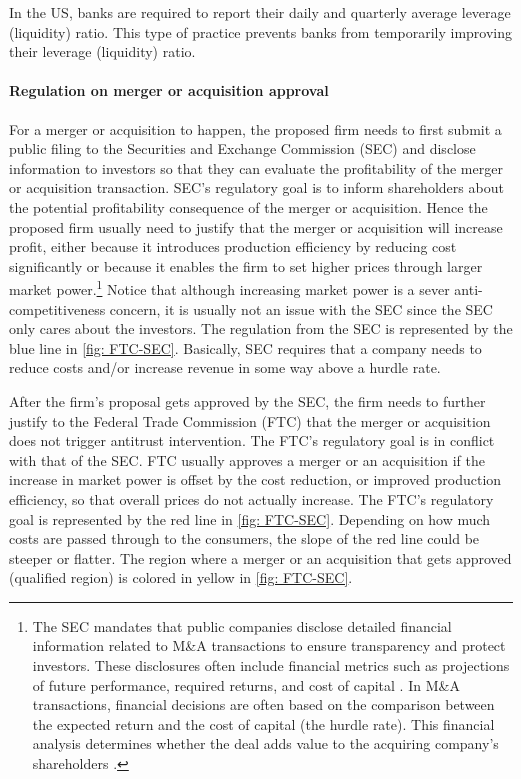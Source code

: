 In the US, banks are required to report their daily and quarterly average leverage (liquidity) ratio.
This type of practice prevents banks from temporarily improving their leverage (liquidity) ratio.




\paragraph{Regulation on merger or acquisition approval}
For a merger or acquisition to happen, the proposed firm needs to first submit a public filing to the Securities and Exchange Commission (SEC) and disclose information to investors so that they can evaluate the profitability of the merger or acquisition transaction.
SEC's regulatory goal is to inform shareholders about the potential profitability consequence of the merger or acquisition.
Hence the proposed firm usually need to justify that the merger or acquisition will increase profit, either because it introduces production efficiency by reducing cost significantly or because it enables the firm to set higher prices through larger market power.\footnote{The SEC mandates that public companies disclose detailed financial information related to M\&A transactions to ensure transparency and protect investors. These disclosures often include financial metrics such as projections of future performance, required returns, and cost of capital \citep{SEC_Regulation_SK, SEC_Form_S4}. In M\&A transactions, financial decisions are often based on the comparison between the expected return and the cost of capital (the hurdle rate). This financial analysis determines whether the deal adds value to the acquiring company’s shareholders \citep{jensen1983market}.}
Notice that although increasing market power is a sever anti-competitiveness concern, it is usually not an issue with the SEC since the SEC only cares about the investors.
The regulation from the SEC is represented by the blue line in \cref{fig: FTC-SEC}.
Basically, SEC requires that a company needs to reduce costs and/or increase revenue in some way above a hurdle rate.

After the firm's proposal gets approved by the SEC, the firm needs to further justify to the Federal Trade Commission (FTC) that the merger or acquisition does not trigger antitrust intervention. 
The FTC's regulatory goal is in conflict with that of the SEC. 
FTC usually approves a merger or an acquisition if the increase in market power is offset by the cost reduction, or improved production efficiency, so that overall prices do not actually increase. 
The FTC's regulatory goal is represented by the red line in \cref{fig: FTC-SEC}.
Depending on how much costs are  passed through to the consumers, the slope of the red line could be steeper or flatter.
The region where a merger or an acquisition that gets approved (qualified region) is colored in yellow in \cref{fig: FTC-SEC}.

